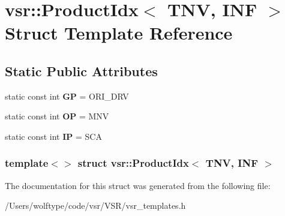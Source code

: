 \hypertarget{structvsr_1_1_product_idx_3_01_t_n_v_00_01_i_n_f_01_4}{\section{vsr\-:\-:Product\-Idx$<$ T\-N\-V, I\-N\-F $>$ Struct Template Reference}
\label{structvsr_1_1_product_idx_3_01_t_n_v_00_01_i_n_f_01_4}
}
\subsection*{Static Public Attributes}
\begin{DoxyCompactItemize}
\item 
\hypertarget{structvsr_1_1_product_idx_3_01_t_n_v_00_01_i_n_f_01_4_ab2a07b4de931e08db44e9fc0559f7e4e}{static const int {\bfseries G\-P} = O\-R\-I\-\_\-\-D\-R\-V}\label{structvsr_1_1_product_idx_3_01_t_n_v_00_01_i_n_f_01_4_ab2a07b4de931e08db44e9fc0559f7e4e}

\item 
\hypertarget{structvsr_1_1_product_idx_3_01_t_n_v_00_01_i_n_f_01_4_a43936cc5de934ee77ab39089409cecfd}{static const int {\bfseries O\-P} = M\-N\-V}\label{structvsr_1_1_product_idx_3_01_t_n_v_00_01_i_n_f_01_4_a43936cc5de934ee77ab39089409cecfd}

\item 
\hypertarget{structvsr_1_1_product_idx_3_01_t_n_v_00_01_i_n_f_01_4_a3eca6841c414e14102abbed6dd28184d}{static const int {\bfseries I\-P} = S\-C\-A}\label{structvsr_1_1_product_idx_3_01_t_n_v_00_01_i_n_f_01_4_a3eca6841c414e14102abbed6dd28184d}

\end{DoxyCompactItemize}
\subsubsection*{template$<$$>$ struct vsr\-::\-Product\-Idx$<$ T\-N\-V, I\-N\-F $>$}



The documentation for this struct was generated from the following file\-:\begin{DoxyCompactItemize}
\item 
/\-Users/wolftype/code/vsr/\-V\-S\-R/vsr\-\_\-templates.\-h\end{DoxyCompactItemize}
